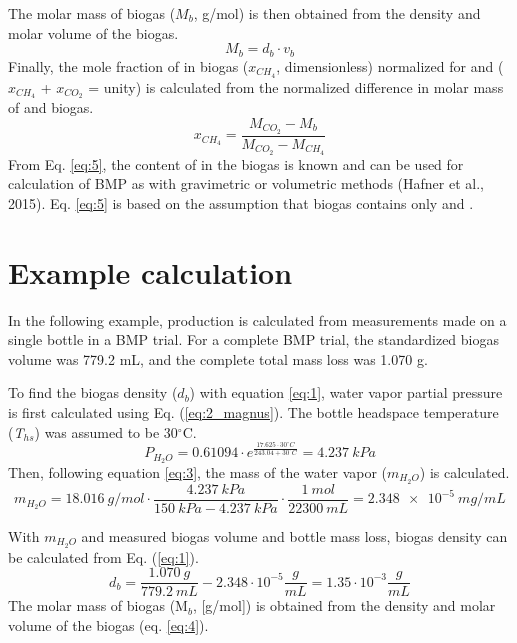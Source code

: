 \documentclass[]{article}
\begin{document}
The molar mass of biogas ($M_b$, g/mol) is then obtained from the density and molar volume of the biogas.
\begin{equation}
  \label{eq:4}
  M_b=d_b \cdot v_b
\end{equation}
Finally, the mole fraction of  in biogas ($x_{CH_4}$, dimensionless) normalized for  and  ($x_{CH_4}$ + $x_{CO_2}$ = unity) is calculated from the normalized difference in molar mass of  and biogas.
\begin{equation}
  \label{eq:5}
  x_{CH_4}=\frac{M_{CO_2}-M_b}{M_{CO_2}-M_{CH_4}}
\end{equation}
From Eq. \ref{eq:5}, the content of  in the biogas is known and can be used for calculation of BMP as with gravimetric or volumetric methods (Hafner et al., 2015). 
Eq. \ref{eq:5} is based on the assumption that biogas contains only  and .

\section{Example calculation} \label{s_example}
In the following example,  production is calculated from measurements made on a single bottle in a BMP trial.
For a complete BMP trial, the standardized biogas volume was 779.2 mL, and the complete total mass loss was 1.070 g.

To find the biogas density ($d_b$) with equation \ref{eq:1}, water vapor partial pressure is first calculated using Eq. (\ref{eq:2_magnus}). 
The bottle headspace temperature (\textit{T}$_{hs}$) was assumed to be 30$^\circ$C.
\begin{equation*}
   P_{H_2O} = 0.61094 \cdot e^{\frac{17.625 \cdot 30^\circ C}{243.04 + 30 ^\circ C}} = 4.237\ kPa
\end{equation*}
Then, following equation \ref{eq:3}, the mass of the water vapor ($m_{H_2O}$) is calculated.
\begin{equation*}
  m_{H_2O} = \SI{18.016} {g/mol} \cdot \frac{\SI{4.237}{kPa}}{\SI{150}{kPa} - \SI{4.237}{kPa}} \cdot \frac{\SI{1}{mol}}{\SI{22300}{mL}} = \SI{2.348e-5}{mg/mL}
\end{equation*}

With $m_{H_2O}$ and measured biogas volume and bottle mass loss, biogas density can be calculated from Eq. (\ref{eq:1}).
\begin{equation*}
  d_b=\frac{1.070\ g}{779.2\ mL} - 2.348 \cdot 10^{-5} \frac{g}{mL} = 1.35 \cdot 10^{-3} \frac{g}{mL}
\end{equation*}
The molar mass of biogas (M$_b$, [g/mol]) is obtained from the density and molar volume of the biogas (eq. \ref{eq:4}).
\end{document}
